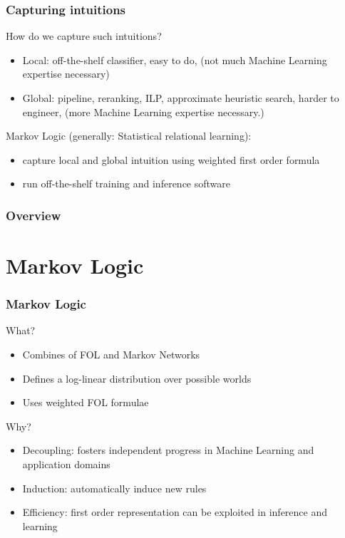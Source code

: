 \documentclass{beamer} \setbeamertemplate{navigation symbols}{}
\begin{document}
\begin{frame}
  \frametitle{Capturing intuitions}

    
  How do we capture such intuitions?

  \pause

  \begin{itemize}
  \item Local: off-the-shelf classifier, easy to do, (not much Machine
    Learning expertise necessary) \pause
  \item Global: pipeline, reranking, ILP, approximate heuristic
    search, harder to engineer, (more Machine Learning expertise
    necessary.)
  \end{itemize}

  \pause
     
  Markov Logic (generally: Statistical relational learning):
  \begin{itemize}

  \item capture local and global intuition using weighted first order
    formula
  \item run off-the-shelf training and inference software
  \end{itemize}



    
\end{frame}

\begin{frame}
  \frametitle{Overview}
  \tableofcontents
\end{frame}

\section{Markov Logic}

\begin{frame}
  \frametitle{Markov Logic}

  What?
  \begin{itemize}
  \item Combines of FOL and Markov Networks
  \item Defines a log-linear distribution over possible worlds
  \item Uses weighted FOL formulae
  \end{itemize}
  Why?
  \begin{itemize}
  \item Decoupling: fosters independent progress in Machine Learning
    and application domains
  \item Induction: automatically induce new rules
  \item Efficiency: first order representation can be exploited in
    inference and learning
  \end{itemize}


\end{frame}
\end{document}
